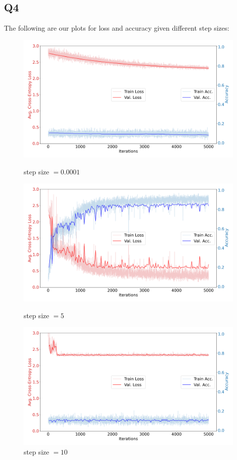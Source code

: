 \documentclass{article}
\theoremstyle{definition}
\begin{document}
    \subsection*{Q4}
        The following are our plots for loss and accuracy given different step sizes:
            \begin{figure}[!htb]
                \includegraphics[width=\linewidth]{figures/2.png}
                \caption{step size $= 0.0001$}\label{fig:awesome_image1}
                \endminipage\hfill
                \includegraphics[width=\linewidth]{figures/3.png}
                \caption{step size $= 5$}\label{fig:awesome_image2}
                \endminipage\hfill
                \includegraphics[width=\linewidth]{figures/4.png}
                \caption{step size $= 10$}\label{fig:awesome_image3}
                \endminipage
            \end{figure}
\end{document}
